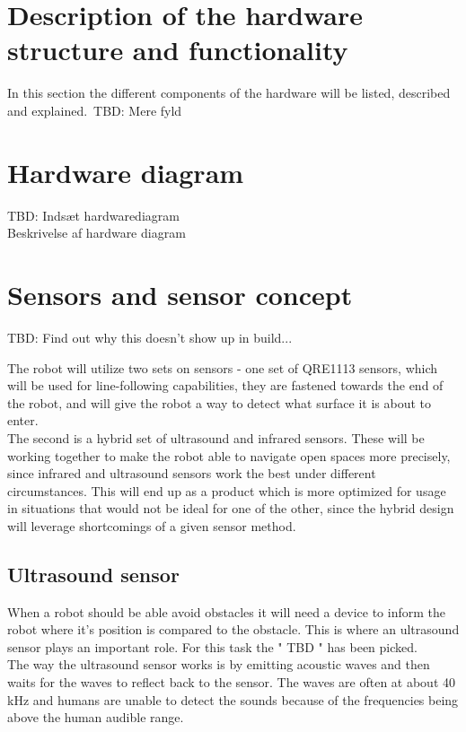\section{Description of the hardware structure and functionality}

In this section the different components of the hardware will be listed, described and explained.\
TBD: Mere fyld

\section{Hardware diagram}

TBD: Indsæt hardwarediagram\\
Beskrivelse af hardware diagram\\

\section{Sensors and sensor concept}

TBD: Find out why this doesn't show up in build...

The robot will utilize two sets on sensors - one set of QRE1113 sensors, which will be used for line-following capabilities, they are fastened towards the end of the robot, and will give the robot a way to detect what surface it is about to enter.\\
The second is a hybrid set of ultrasound and infrared sensors. These will be working together to make the robot able to navigate open spaces more precisely, since infrared and ultrasound sensors work the best under different circumstances. This will end up as a product which is more optimized for usage in situations that would not be ideal for one of the other, since the hybrid design will leverage shortcomings of a given sensor method.\\

\subsection{Ultrasound sensor}
When a robot should be able avoid obstacles it will need a device to inform the robot where it's position is compared to the obstacle. This is where an ultrasound sensor plays an important role. For this task the " TBD " has been picked.\\

The way the ultrasound sensor works is by emitting acoustic waves and then waits for the waves to reflect back to the sensor. The waves are often at about 40 kHz and humans are unable to detect the sounds because of the frequencies being above the human audible range.\

